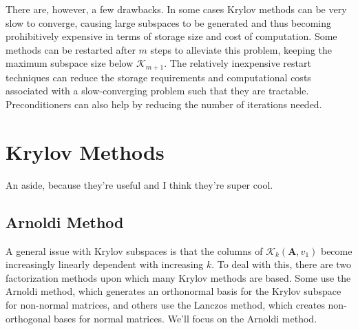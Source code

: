 \documentclass[12pt]{article}
\newcommand{\ve}[1]{\ensuremath{\mathbf{#1}}}
\begin{document}
There are, however, a few drawbacks. In some cases Krylov methods can be very slow to converge, causing large subspaces to be generated and thus becoming prohibitively expensive in terms of storage size and cost of computation. Some methods can be restarted after $m$ steps %
to alleviate this problem, keeping the maximum subspace size below $\mathcal{K}_{m+1}$.  The relatively inexpensive restart techniques can reduce the storage requirements and computational costs associated with a slow-converging problem such that they are tractable. Preconditioners can also help by reducing the number of iterations needed. %


\section*{Krylov Methods}
An aside, because they're useful and I think they're super cool. 
\subsection*{Arnoldi Method}
A general issue with Krylov subspaces is that the columns of $\mathcal{K}_{k}(\ve{A},v_{1})$ become increasingly linearly dependent with increasing $k$. To deal with this, there are two factorization methods upon which many Krylov methods are based. Some use the Arnoldi method, which generates an orthonormal basis for the Krylov subspace for non-normal matrices, and others use the Lanczos method, which creates non-orthogonal bases for normal matrices. %
We'll focus on the Arnoldi method.
\end{document}
